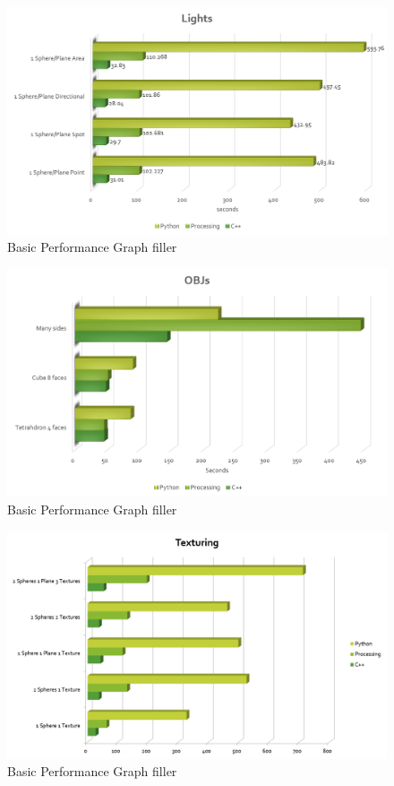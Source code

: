 \begin{figure}[ht]
\centering
\includegraphics[width=\textwidth]{figures/graphs/lights-graph.png}
\caption{Basic Performance Graph filler}
\label{fig:lightsgraph}
\end{figure}

\begin{figure}[ht]
\centering
\includegraphics[width=\textwidth]{figures/graphs/obj-graph.png}
\caption{Basic Performance Graph filler}
\label{fig:basicgraph}
\end{figure}

\begin{figure}[ht]
\centering
\includegraphics[width=\textwidth]{figures/graphs/texturing.png}
\caption{Basic Performance Graph filler}
\label{fig:basicgraph}
\end{figure}

